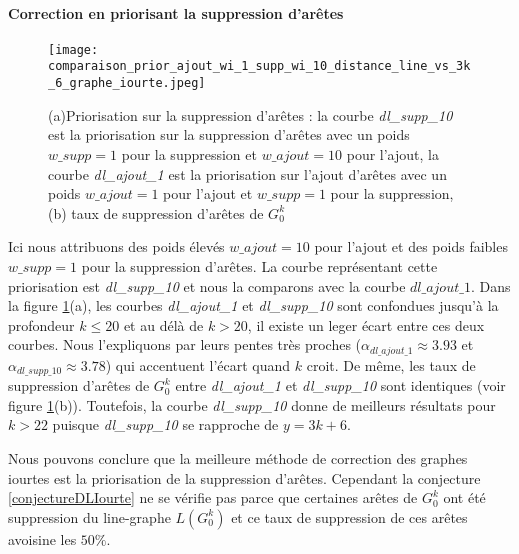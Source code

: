 \documentclass[onecolumn, 12pt]{book}
\begin{document}
\paragraph{Correction en priorisant la suppression d'ar\^etes } %
\begin{figure}[htb!] 
\centering
\texttt{[image: comparaison\_prior\_ajout\_wi\_1\_supp\_wi\_10\_distance\_line\_vs\_3k\_6\_graphe\_iourte.jpeg]}
\caption{(a)Priorisation sur la suppression d'ar\^etes : la courbe {\em dl\_supp\_10} est la priorisation sur la suppression d'ar\^etes avec un poids $w\_supp=1$ pour la suppression et $w\_ajout = 10$ pour l'ajout,   la courbe {\em dl\_ajout\_1} est la priorisation sur l'ajout d'ar\^etes avec un poids $w\_ajout=1$ pour l'ajout et $w\_supp = 1$ pour la suppression, (b) taux de suppression d'ar\^etes de $G_0^k$}
\label{priorAjout1Supp10} 
\end{figure}
Ici nous attribuons des poids \'elev\'es  $w\_ajout = 10$ pour l'ajout et des poids faibles $w\_supp = 1$ pour la suppression d'ar\^etes. La courbe repr\'esentant cette priorisation est  {\em dl\_supp\_10} et nous la comparons avec la courbe $dl\_ajout\_1$.
\newline
Dans la figure  \ref{priorAjout1Supp10}(a), les courbes {\em dl\_ajout\_1} et {\em dl\_supp\_10} sont confondues jusqu'\`a la profondeur $k \le 20$ et au d\'el\`a de $k > 20$, il existe un leger \'ecart entre ces deux courbes. Nous l'expliquons par leurs pentes tr\`es proches ($\alpha_{dl\_ajout\_1} \approx 3.93$ et $\alpha_{dl\_supp\_10} \approx 3.78$) qui accentuent l'\'ecart quand $k$ croit. De m\^eme, les taux de suppression d'ar\^etes de $G_0^k$ entre  {\em dl\_ajout\_1} et {\em dl\_supp\_10} sont identiques (voir figure \ref{priorAjout1Supp10}(b)).
Toutefois, la courbe {\em dl\_supp\_10} donne de meilleurs r\'esultats pour $k > 22$ puisque {\em dl\_supp\_10} se rapproche de $y=3k+6$.

Nous pouvons conclure que la meilleure m\'ethode de correction des graphes iourtes est la priorisation de la suppression d'ar\^etes.
Cependant la conjecture \ref{conjectureDLIourte} ne se v\'erifie pas parce que certaines ar\^etes de $G_0^k$ ont \'et\'e suppression du line-graphe $L(G_0^k)$ et ce taux de suppression de ces ar\^etes  avoisine les $50\%$.
\end{document}
